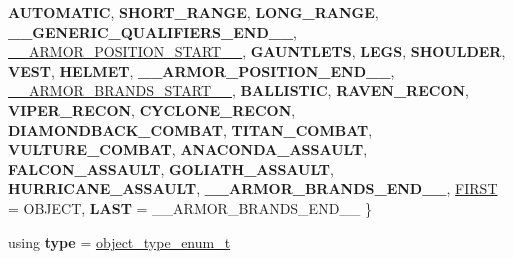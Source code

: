 \begin{DoxyCompactItemize}
{\bfseries A\+U\+T\+O\+M\+A\+T\+IC}, 
{\bfseries S\+H\+O\+R\+T\+\_\+\+R\+A\+N\+GE}, 
{\bfseries L\+O\+N\+G\+\_\+\+R\+A\+N\+GE}, 
\newline
{\bfseries \+\_\+\+\_\+\+G\+E\+N\+E\+R\+I\+C\+\_\+\+Q\+U\+A\+L\+I\+F\+I\+E\+R\+S\+\_\+\+E\+N\+D\+\_\+\+\_\+}, 
\hyperlink{structmods_1_1object_a6a8f895bbe1d2306a097a2090a6caf7faad204a12a16880ac05a079a6ac294ea3}{\+\_\+\+\_\+\+A\+R\+M\+O\+R\+\_\+\+P\+O\+S\+I\+T\+I\+O\+N\+\_\+\+S\+T\+A\+R\+T\+\_\+\+\_\+}, 
{\bfseries G\+A\+U\+N\+T\+L\+E\+TS}, 
{\bfseries L\+E\+GS}, 
\newline
{\bfseries S\+H\+O\+U\+L\+D\+ER}, 
{\bfseries V\+E\+ST}, 
{\bfseries H\+E\+L\+M\+ET}, 
{\bfseries \+\_\+\+\_\+\+A\+R\+M\+O\+R\+\_\+\+P\+O\+S\+I\+T\+I\+O\+N\+\_\+\+E\+N\+D\+\_\+\+\_\+}, 
\newline
\hyperlink{structmods_1_1object_a6a8f895bbe1d2306a097a2090a6caf7fa580e908502d877b1d9243f134fbcdb78}{\+\_\+\+\_\+\+A\+R\+M\+O\+R\+\_\+\+B\+R\+A\+N\+D\+S\+\_\+\+S\+T\+A\+R\+T\+\_\+\+\_\+}, 
{\bfseries B\+A\+L\+L\+I\+S\+T\+IC}, 
{\bfseries R\+A\+V\+E\+N\+\_\+\+R\+E\+C\+ON}, 
{\bfseries V\+I\+P\+E\+R\+\_\+\+R\+E\+C\+ON}, 
\newline
{\bfseries C\+Y\+C\+L\+O\+N\+E\+\_\+\+R\+E\+C\+ON}, 
{\bfseries D\+I\+A\+M\+O\+N\+D\+B\+A\+C\+K\+\_\+\+C\+O\+M\+B\+AT}, 
{\bfseries T\+I\+T\+A\+N\+\_\+\+C\+O\+M\+B\+AT}, 
{\bfseries V\+U\+L\+T\+U\+R\+E\+\_\+\+C\+O\+M\+B\+AT}, 
\newline
{\bfseries A\+N\+A\+C\+O\+N\+D\+A\+\_\+\+A\+S\+S\+A\+U\+LT}, 
{\bfseries F\+A\+L\+C\+O\+N\+\_\+\+A\+S\+S\+A\+U\+LT}, 
{\bfseries G\+O\+L\+I\+A\+T\+H\+\_\+\+A\+S\+S\+A\+U\+LT}, 
{\bfseries H\+U\+R\+R\+I\+C\+A\+N\+E\+\_\+\+A\+S\+S\+A\+U\+LT}, 
\newline
{\bfseries \+\_\+\+\_\+\+A\+R\+M\+O\+R\+\_\+\+B\+R\+A\+N\+D\+S\+\_\+\+E\+N\+D\+\_\+\+\_\+}, 
\hyperlink{structmods_1_1object_a6a8f895bbe1d2306a097a2090a6caf7fa7ccaec47a076f7b853883551349def93}{F\+I\+R\+ST} = O\+B\+J\+E\+CT, 
{\bfseries L\+A\+ST} = \+\_\+\+\_\+\+A\+R\+M\+O\+R\+\_\+\+B\+R\+A\+N\+D\+S\+\_\+\+E\+N\+D\+\_\+\+\_\+
 \}
\item 
\mbox{\label{structmods_1_1object_a6f570609b22ac4d27d950c763617e949}} 
using {\bfseries type} = \hyperlink{structmods_1_1object_a6a8f895bbe1d2306a097a2090a6caf7f}{object\+\_\+type\+\_\+enum\+\_\+t}
\end{DoxyCompactItemize}
